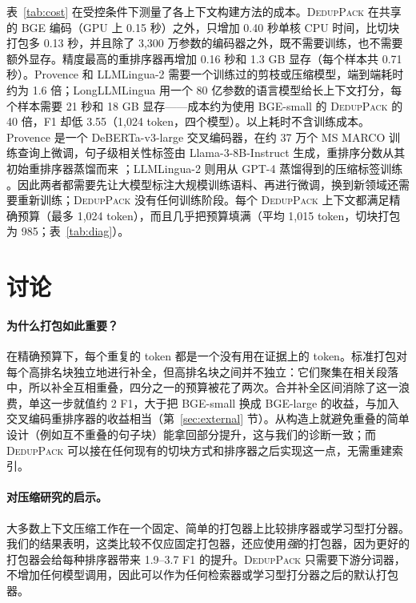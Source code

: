 \documentclass[11pt]{article}
\newcommand{\spk}{\textsc{DedupPack}}
\begin{document}
表~\ref{tab:cost} 在受控条件下测量了各上下文构建方法的成本。\spk{} 在共享的 BGE 编码（GPU 上 0.15 秒）之外，只增加 0.40 秒单核 CPU 时间，比切块打包多 0.13 秒，并且除了 3,300 万参数的编码器之外，既不需要训练，也不需要额外显存。精度最高的重排序器再增加 0.16 秒和 1.3 GB 显存（每个样本共 0.71 秒）。Provence 和 LLMLingua-2 需要一个训练过的剪枝或压缩模型，端到端耗时约为 1.6 倍；LongLLMLingua 用一个 80 亿参数的语言模型给长上下文打分，每个样本需要 21 秒和 18 GB 显存——成本约为使用 BGE-small 的 \spk{} 的 40 倍，F1 却低 3.55（1,024 token，四个模型）。以上耗时不含训练成本。Provence 是一个 DeBERTa-v3-large 交叉编码器，在约 37 万个 MS MARCO 训练查询上微调，句子级相关性标签由 Llama-3-8B-Instruct 生成，重排序分数从其初始重排序器蒸馏而来 \citep{chirkova2025provence}；LLMLingua-2 则用从 GPT-4 蒸馏得到的压缩标签训练 \citep{pan2024llmlingua2}。因此两者都需要先让大模型标注大规模训练语料、再进行微调，换到新领域还需要重新训练；\spk{} 没有任何训练阶段。每个 \spk{} 上下文都满足精确预算（最多 1,024 token），而且几乎把预算填满（平均 1,015 token，切块打包为 985；表~\ref{tab:diag}）。

\section{讨论}

\paragraph{为什么打包如此重要？}在精确预算下，每个重复的 token 都是一个没有用在证据上的 token。标准打包对每个高排名块独立地进行补全，但高排名块之间并不独立：它们聚集在相关段落中，所以补全互相重叠，四分之一的预算被花了两次。合并补全区间消除了这一浪费，单这一步就值约 2 F1，大于把 BGE-small 换成 BGE-large 的收益，与加入交叉编码重排序器的收益相当（第~\ref{sec:external} 节）。从构造上就避免重叠的简单设计（例如互不重叠的句子块）能拿回部分提升，这与我们的诊断一致；而 \spk{} 可以接在任何现有的切块方式和排序器之后实现这一点，无需重建索引。

\paragraph{对压缩研究的启示。}大多数上下文压缩工作在一个固定、简单的打包器上比较排序器或学习型打分器。我们的结果表明，这类比较不仅应固定打包器，还应使用\emph{强}的打包器，因为更好的打包器会给每种排序器带来 1.9--3.7 F1 的提升。\spk{} 只需要下游分词器，不增加任何模型调用，因此可以作为任何检索器或学习型打分器之后的默认打包器。
\end{document}
